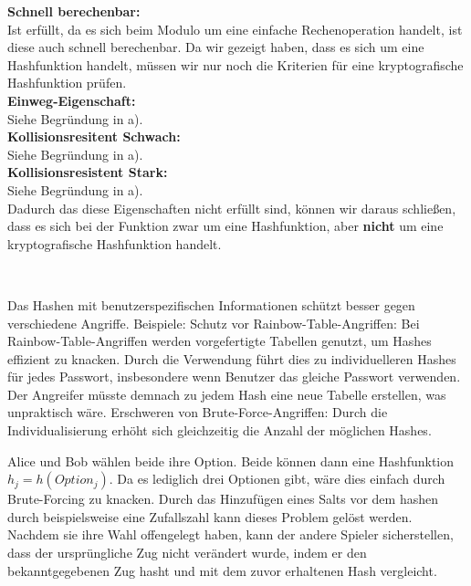 \documentclass[german]{../uebung}
\begin{document}
\begin{exercise}{1}
    \textbf{Schnell berechenbar:}\\
    Ist erfüllt, da es sich beim Modulo um eine einfache Rechenoperation handelt, ist diese auch schnell berechenbar.
    Da wir gezeigt haben, dass es sich um eine Hashfunktion handelt, müssen wir nur noch die Kriterien für eine kryptografische Hashfunktion prüfen.\\
    \textbf{Einweg-Eigenschaft:}\\
    Siehe Begründung in a).\\
    \textbf{Kollisionsresitent Schwach:}\\
    Siehe Begründung in a).\\
    \textbf{Kollisionsresistent Stark:}\\
    Siehe Begründung in a).\\
    Dadurch das diese Eigenschaften nicht erfüllt sind, können wir daraus schließen, dass es sich bei der Funktion zwar um eine Hashfunktion, aber \textbf{nicht} um eine kryptografische Hashfunktion handelt.
\end{exercise}\\

\begin{exercise}{2}
    Das Hashen mit benutzerspezifischen Informationen schützt besser gegen verschiedene Angriffe. Beispiele:
    Schutz vor Rainbow-Table-Angriffen: Bei Rainbow-Table-Angriffen werden vorgefertigte Tabellen genutzt, um Hashes effizient zu knacken. Durch die Verwendung führt dies zu individuelleren Hashes für jedes Passwort, insbesondere wenn Benutzer das gleiche Passwort verwenden. Der Angreifer müsste demnach zu jedem Hash eine neue Tabelle erstellen, was unpraktisch wäre.
    Erschweren von Brute-Force-Angriffen: Durch die Individualisierung erhöht sich gleichzeitig die Anzahl der möglichen Hashes.\\
\end{exercise}

\begin{exercise}{3}
    Alice und Bob wählen beide ihre Option. Beide können dann eine Hashfunktion \(h_j=h(Option_j)\). Da es lediglich drei Optionen gibt, wäre dies einfach durch Brute-Forcing zu knacken. Durch das Hinzufügen eines Salts vor dem hashen durch beispielsweise eine Zufallszahl kann dieses Problem gelöst werden. Nachdem sie ihre Wahl offengelegt haben, kann der andere Spieler sicherstellen, dass der ursprüngliche Zug nicht verändert wurde, indem er den bekanntgegebenen Zug hasht und mit dem zuvor erhaltenen Hash vergleicht.\\
\end{exercise}
\end{document}
